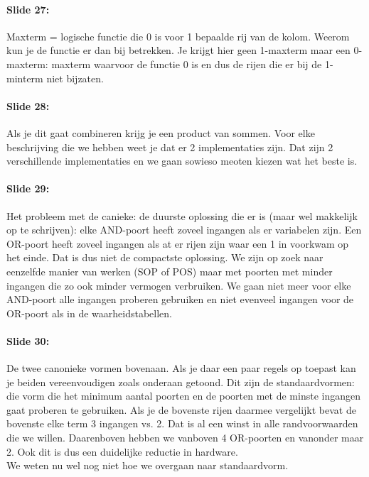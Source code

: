 \documentclass[10pt,a4paper]{book}
\begin{document}
\paragraph{Slide 27:} Maxterm = logische functie die 0 is voor 1 bepaalde rij van de kolom. Weerom kun je de functie er dan bij betrekken. Je krijgt hier geen 1-maxterm maar een 0-maxterm: maxterm waarvoor de functie 0 is en dus de rijen die er bij de 1-minterm niet bijzaten.

\paragraph{Slide 28:} Als je dit gaat combineren krijg je een product van sommen. Voor elke beschrijving die we hebben weet je dat er 2 implementaties zijn. Dat zijn 2 verschillende implementaties en we gaan sowieso meoten kiezen wat het beste is.

\paragraph{Slide 29:} Het probleem met de canieke: de duurste oplossing die er is (maar wel makkelijk op te schrijven): elke AND-poort heeft zoveel ingangen als er variabelen zijn. Een OR-poort heeft zoveel ingangen als at er rijen zijn waar een 1 in voorkwam op het einde. Dat is dus niet de compactste oplossing. We zijn op zoek naar eenzelfde manier van werken (SOP of POS) maar met poorten met minder ingangen die zo ook minder vermogen verbruiken. We gaan niet meer voor elke AND-poort alle ingangen proberen gebruiken en niet evenveel ingangen voor de OR-poort als in de waarheidstabellen.

\paragraph{Slide 30:} De twee canonieke vormen bovenaan. Als je daar een paar regels op toepast kan je beiden vereenvoudigen zoals onderaan getoond. Dit zijn de standaardvormen: die vorm die het minimum aantal poorten en de poorten met de minste ingangen gaat proberen te gebruiken. Als je de bovenste rijen daarmee vergelijkt bevat de bovenste elke term 3 ingangen vs. 2. Dat is al een winst in alle randvoorwaarden die we willen. Daarenboven hebben we vanboven 4 OR-poorten en vanonder maar 2. Ook dit is dus een duidelijke reductie in hardware.\\
We weten nu wel nog niet hoe we overgaan naar standaardvorm.
\end{document}
